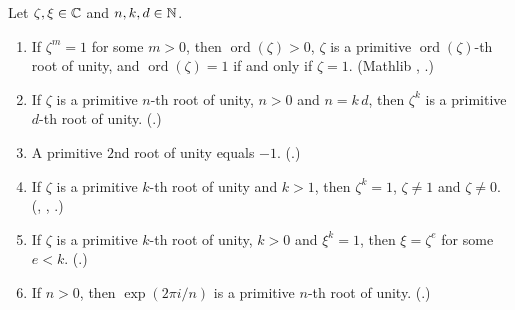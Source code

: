 \begin{lemma}\label{sr:lem:prim}
Let $\zeta,\xi\in\mathbb C$ and $n,k,d\in\mathbb N$.
\begin{enumerate}[label=(P\arabic*)]
\item If $\zeta^m=1$ for some $m>0$, then $\operatorname{ord}(\zeta)>0$, $\zeta$ is a primitive
  $\operatorname{ord}(\zeta)$-th root of unity, and $\operatorname{ord}(\zeta)=1$ if and only if $\zeta=1$. (Mathlib
  , .)
\item If $\zeta$ is a primitive $n$-th root of unity, $n>0$ and $n=k\,d$, then $\zeta^k$ is a primitive $d$-th root of
  unity. (.)
\item A primitive $2$nd root of unity equals $-1$. (.)
\item If $\zeta$ is a primitive $k$-th root of unity and $k>1$, then $\zeta^k=1$, $\zeta\ne1$ and $\zeta\ne0$.
  (, , .)
\item If $\zeta$ is a primitive $k$-th root of unity, $k>0$ and $\xi^k=1$, then $\xi=\zeta^e$ for some $e<k$.
  (.)
\item If $n>0$, then $\exp(2\pi i/n)$ is a primitive $n$-th root of unity. (.)
\end{enumerate}
\end{lemma}

